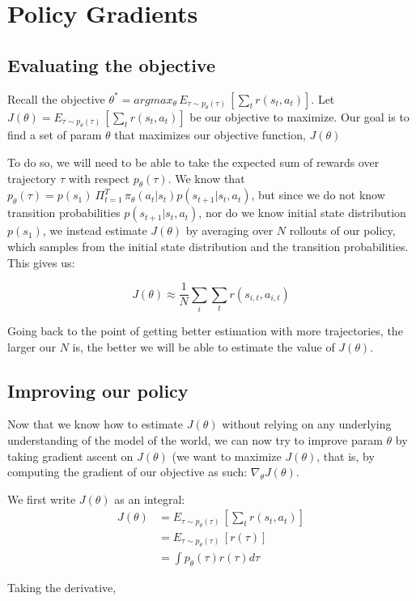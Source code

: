 \documentclass[11pt]{article} %
\begin{document}
\section{Policy Gradients}
\subsection{Evaluating the objective}
Recall the objective $\theta^* = argmax_\theta\, E_{\tau \sim p_\theta(\tau)}\,[\sum_t r(s_t, a_t)]$. Let $J(\theta) = E_{\tau \sim p_\theta(\tau)}\,[\sum_t r(s_t, a_t)]$ be our objective to maximize. Our goal is to find a set of param $\theta$ that maximizes our objective function, $J(\theta)$

To do so, we will need to be able to take the expected sum of rewards over trajectory $\tau$ with respect $p_\theta(\tau)$. We know that $p_\theta(\tau) = p(s_1)\: \Pi^T_{t=1}\,\pi_\theta(a_t|s_t)p(s_{t+1}|s_t, a_t)$, but since we do not know transition probabilities $p(s_{t+1}|s_t, a_t)$, nor do we know initial state distribution $p(s_1)$, we instead estimate $J(\theta)$ by averaging over $N$ rollouts of our policy, which samples from the initial state distribution and the transition probabilities. This gives us: 

\begin{equation}\label{eq:objective_funct}
    J(\theta) \approx \frac{1}{N}\sum_i\sum_t r(s_{i,t}, a_{i,t})
\end{equation}

Going back to the point of getting better estimation with more trajectories, the larger our $N$ is, the better we will be able to estimate the value of $J(\theta)$.

\subsection{Improving our policy}
Now that we know how to estimate $J(\theta)$ without relying on any underlying understanding of the model of the world, we can now try to improve param $\theta$ by taking gradient ascent on $J(\theta)$ (we want to maximize $J(\theta)$, that is, by computing the gradient of our objective as such: $\nabla_\theta J(\theta)$.

We first write $J(\theta)$ as an integral:
\begin{equation*}
\begin{split}
        J(\theta) &= E_{\tau \sim p_\theta(\tau)}\,[\sum_t r(s_t, a_t)] \\ &= E_{\tau \sim p_\theta(\tau)}\,[r(\tau)] \\
        &= \int p_\theta(\tau)r(\tau)d\tau
\end{split}
\end{equation*}

Taking the derivative,
\begin{equation*}
\begin{split}

\end{split}
\end{equation*}
\newpage


\end{document}
